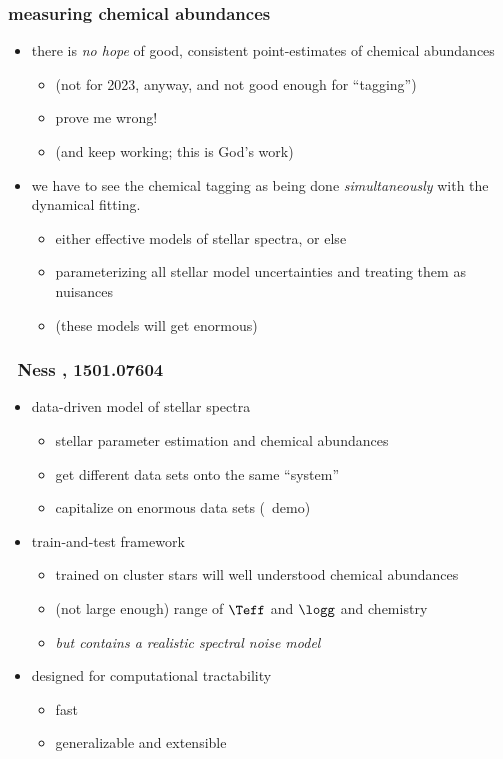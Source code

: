 \documentclass[pdftex]{beamer}
\begin{document}
\begin{frame}
  \frametitle{measuring chemical abundances}
  \begin{itemize}
  \item there is \emph{no hope} of good, consistent point-estimates of
    chemical abundances
    \begin{itemize}
    \item (not for 2023, anyway, and not good enough for ``tagging'')
    \item prove me wrong!
    \item (and keep working; this is God's work)
    \end{itemize}
  \item we have to see the chemical tagging as being done
    \emph{simultaneously} with the dynamical fitting.
    \begin{itemize}
    \item either effective models of stellar spectra, or else
    \item parameterizing all stellar model uncertainties and treating them as nuisances
    \item (these models will get enormous)
    \end{itemize}
  \end{itemize}
\end{frame}

\begin{frame}
  \frametitle{\tc~{\footnotesize Ness \etal, 1501.07604}}
  \begin{itemize}
  \item data-driven model of stellar spectra
    \begin{itemize}
    \item stellar parameter estimation and chemical abundances
    \item get different data sets onto the same ``system'' 
    \item capitalize on enormous data sets (\apogee\ demo)
    \end{itemize}
  \item train-and-test framework
    \begin{itemize}
    \item trained on cluster stars will well understood chemical abundances
    \item (not large enough) range of $\Teff$ and $\logg$ and chemistry
    \item \emph{but contains a realistic spectral noise model}
    \end{itemize}
  \item designed for computational tractability
    \begin{itemize}
    \item fast
    \item generalizable and extensible
    \end{itemize}
  \end{itemize}
\end{frame}
\end{document}
